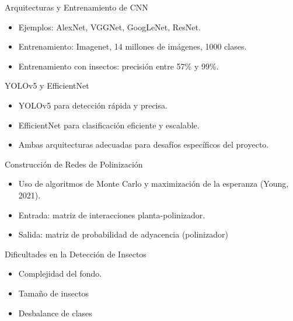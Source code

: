 \begin{frame}
    \vspace*{-0.5cm}
    \begin{block}{Arquitecturas y Entrenamiento de CNN}
        \begin{itemize}
            \item Ejemplos: AlexNet, VGGNet, GoogLeNet, ResNet.
            \item Entrenamiento: Imagenet, 14 millones de imágenes, 1000 clases.
            \item Entrenamiento con insectos: precisión entre 57\% y 99\%.
        \end{itemize}
    \end{block}
    \pause
    \begin{block}{YOLOv5 y EfficientNet}
        \begin{itemize}
            \item YOLOv5 para detección rápida y precisa.
            \item EfficientNet para clasificación eficiente y escalable.
            \item Ambas arquitecturas adecuadas para desafíos específicos del proyecto.
        \end{itemize}
    \end{block}
\end{frame}

\begin{frame}
    \vspace*{-1cm}
    \begin{block}{Construcción de Redes de Polinización}
        \begin{itemize}
            \item Uso de algoritmos de Monte Carlo y maximización de la esperanza (Young, 2021).
            \item Entrada: matriz de interacciones planta-polinizador.
            \item Salida: matriz de probabilidad de adyacencia (polinizador)
        \end{itemize}
    \end{block}
    \pause
    \begin{block}{Dificultades en la Detección de Insectos}
        \begin{itemize}
            \item Complejidad del fondo.
            \item Tamaño de insectos
            \item Desbalance de clases
        \end{itemize}
    \end{block}
\end{frame}
    